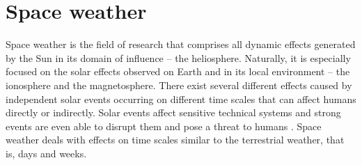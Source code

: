 

% 
% 





\section{Space weather}
\label{sec:space_weather}
Space weather is the field of research that comprises all dynamic effects generated by the Sun in its domain of influence -- the heliosphere. Naturally, it is especially focused on the solar effects observed on Earth and in its local environment -- the ionosphere and the magnetosphere. There exist several different effects caused by independent solar events occurring on different time scales that can affect humans directly or indirectly. Solar events affect sensitive technical systems and strong events are even able to disrupt them and pose a threat to humans \citep{Bothmer2007}. Space weather deals with effects on time scales similar to the terrestrial weather, that is, days and weeks.

